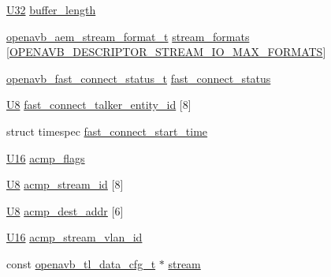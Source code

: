 \begin{DoxyCompactItemize}
\item 
\hyperlink{openavb__types__base__pub_8h_a696390429f2f3b644bde8d0322a24124}{U32} \hyperlink{structopenavb__aem__descriptor__stream__io__t_a47086525ce8f96ae8b84a7ad166ea3b3}{buffer\+\_\+length}
\item 
\hyperlink{structopenavb__aem__stream__format__t}{openavb\+\_\+aem\+\_\+stream\+\_\+format\+\_\+t} \hyperlink{structopenavb__aem__descriptor__stream__io__t_aea693d8a1d99fa0ba587e052fd8e0175}{stream\+\_\+formats} \mbox{[}\hyperlink{openavb__descriptor__stream__io__pub_8h_a4994afc0c0d65ce097b2c05d7745de6d}{O\+P\+E\+N\+A\+V\+B\+\_\+\+D\+E\+S\+C\+R\+I\+P\+T\+O\+R\+\_\+\+S\+T\+R\+E\+A\+M\+\_\+\+I\+O\+\_\+\+M\+A\+X\+\_\+\+F\+O\+R\+M\+A\+TS}\mbox{]}
\item 
\hyperlink{openavb__descriptor__stream__io__pub_8h_ae6ea02b4f869c41577cfeba2d0c709b4}{openavb\+\_\+fast\+\_\+connect\+\_\+status\+\_\+t} \hyperlink{structopenavb__aem__descriptor__stream__io__t_a27979bafb0c8d81df88d4310ca08b94b}{fast\+\_\+connect\+\_\+status}
\item 
\hyperlink{openavb__types__base__pub_8h_aa63ef7b996d5487ce35a5a66601f3e73}{U8} \hyperlink{structopenavb__aem__descriptor__stream__io__t_ab0faa2b4ba9b5db39237037c43093be0}{fast\+\_\+connect\+\_\+talker\+\_\+entity\+\_\+id} \mbox{[}8\mbox{]}
\item 
struct timespec \hyperlink{structopenavb__aem__descriptor__stream__io__t_a2409d602e72d4f5a62ec6eaa7e68281b}{fast\+\_\+connect\+\_\+start\+\_\+time}
\item 
\hyperlink{openavb__types__base__pub_8h_a0a0a322d5fa4a546d293a77ba8b4a71f}{U16} \hyperlink{structopenavb__aem__descriptor__stream__io__t_afe3bda8022a2df033f4cf61858a8a016}{acmp\+\_\+flags}
\item 
\hyperlink{openavb__types__base__pub_8h_aa63ef7b996d5487ce35a5a66601f3e73}{U8} \hyperlink{structopenavb__aem__descriptor__stream__io__t_a9b0221fd126a279c39fccd788efd6a66}{acmp\+\_\+stream\+\_\+id} \mbox{[}8\mbox{]}
\item 
\hyperlink{openavb__types__base__pub_8h_aa63ef7b996d5487ce35a5a66601f3e73}{U8} \hyperlink{structopenavb__aem__descriptor__stream__io__t_a34430b0f08246fa8026b9c6c310eb33b}{acmp\+\_\+dest\+\_\+addr} \mbox{[}6\mbox{]}
\item 
\hyperlink{openavb__types__base__pub_8h_a0a0a322d5fa4a546d293a77ba8b4a71f}{U16} \hyperlink{structopenavb__aem__descriptor__stream__io__t_a0bc04ef609352f4440a04f2d1222b7bb}{acmp\+\_\+stream\+\_\+vlan\+\_\+id}
\item 
const \hyperlink{openavb__avdecc__read__ini__pub_8h_a2c6c3608b0b8c34af5fa95c11753cfc0}{openavb\+\_\+tl\+\_\+data\+\_\+cfg\+\_\+t} $\ast$ \hyperlink{structopenavb__aem__descriptor__stream__io__t_a4dc1fffc055ad41dc931468c7916665f}{stream}
\end{DoxyCompactItemize}


